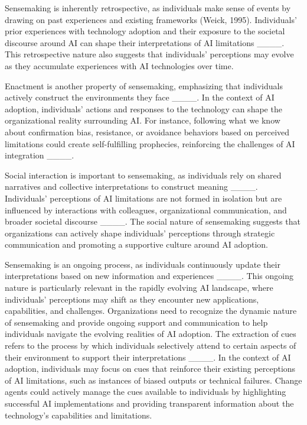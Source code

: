 Sensemaking is inherently retrospective, as individuals make sense of events by drawing on past experiences and existing frameworks (Weick, 1995). Individuals' prior experiences with technology adoption and their exposure to the societal discourse around AI can shape their interpretations of AI limitations ____. This retrospective nature also suggests that individuals' perceptions may evolve as they accumulate experiences with AI technologies over time.

Enactment is another property of sensemaking, emphasizing that individuals actively construct the environments they face ____. In the context of AI adoption, individuals' actions and responses to the technology can shape the organizational reality surrounding AI. For instance, following what we know about confirmation bias, resistance, or avoidance behaviors based on perceived limitations could create self-fulfilling prophecies, reinforcing the challenges of AI integration ____.

Social interaction is important to sensemaking, as individuals rely on shared narratives and collective interpretations to construct meaning ____. Individuals' perceptions of AI limitations are not formed in isolation but are influenced by interactions with colleagues, organizational communication, and broader societal discourse ____. The social nature of sensemaking suggests that organizations can actively shape individuals' perceptions through strategic communication and promoting a supportive culture around AI adoption.

Sensemaking is an ongoing process, as individuals continuously update their interpretations based on new information and experiences ____. This ongoing nature is particularly relevant in the rapidly evolving AI landscape, where individuals' perceptions may shift as they encounter new applications, capabilities, and challenges. Organizations need to recognize the dynamic nature of sensemaking and provide ongoing support and communication to help individuals navigate the evolving realities of AI adoption.
The extraction of cues refers to the process by which individuals selectively attend to certain aspects of their environment to support their interpretations ____. In the context of AI adoption, individuals may focus on cues that reinforce their existing perceptions of AI limitations, such as instances of biased outputs or technical failures. Change agents could actively manage the cues available to individuals by highlighting successful AI implementations and providing transparent information about the technology's capabilities and limitations.


